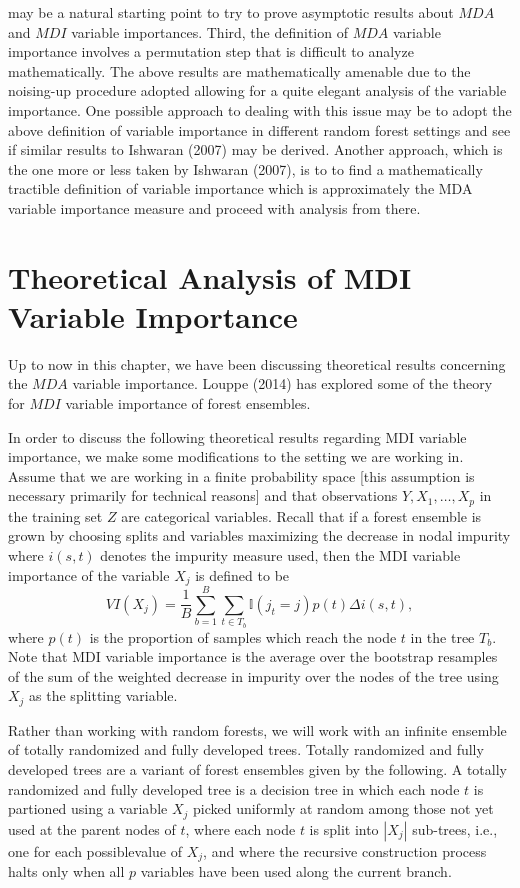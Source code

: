 \documentclass[12pt,twoside]{reedthesis}
\theoremstyle{definition}
\theoremstyle{definition}
\theoremstyle{definition}
\theoremstyle{remark}
\begin{document}
may be a natural starting point to try to prove asymptotic results about
\(MDA\) and \(MDI\) variable importances. Third, the definition of
\(MDA\) variable importance involves a permutation step that is
difficult to analyze mathematically. The above results are
mathematically amenable due to the noising-up procedure adopted allowing
for a quite elegant analysis of the variable importance. One possible
approach to dealing with this issue may be to adopt the above definition
of variable importance in different random forest settings and see if
similar results to Ishwaran (2007) may be derived. Another approach,
which is the one more or less taken by Ishwaran (2007), is to to find a
mathematically tractible definition of variable importance which is
approximately the MDA variable importance measure and proceed with
analysis from there.

\section{Theoretical Analysis of MDI Variable
Importance}\label{theoretical-analysis-of-mdi-variable-importance}

Up to now in this chapter, we have been discussing theoretical results
concerning the \(MDA\) variable importance. Louppe (2014) has explored
some of the theory for \(MDI\) variable importance of forest ensembles.

In order to discuss the following theoretical results regarding MDI
variable importance, we make some modifications to the setting we are
working in. Assume that we are working in a finite probability space
{[}this assumption is necessary primarily for technical reasons{]} and
that observations \(Y,X_1,\ldots,X_p\) in the training set \(Z\) are
categorical variables. Recall that if a forest ensemble is grown by
choosing splits and variables maximizing the decrease in nodal impurity
where \(i(s,t)\) denotes the impurity measure used, then the MDI
variable importance of the variable \(X_j\) is defined to be
\[VI(X_j)=\frac{1}{B}\sum_{b=1}^B \sum_{t\in T_b} \mathbb{I}(j_t=j)p(t)\Delta i(s,t),\]
where \(p(t)\) is the proportion of samples which reach the node \(t\)
in the tree \(T_b\). Note that MDI variable importance is the average
over the bootstrap resamples of the sum of the weighted decrease in
impurity over the nodes of the tree using \(X_j\) as the splitting
variable.

Rather than working with random forests, we will work with an infinite
ensemble of totally randomized and fully developed trees. Totally
randomized and fully developed trees are a variant of forest ensembles
given by the following. A totally randomized and fully developed tree is
a decision tree in which each node \(t\) is partioned using a variable
\(X_j\) picked uniformly at random among those not yet used at the
parent nodes of \(t\), where each node \(t\) is split into \(|X_j|\)
sub-trees, i.e., one for each possiblevalue of \(X_j\), and where the
recursive construction process halts only when all \(p\) variables have
been used along the current branch.
\end{document}
